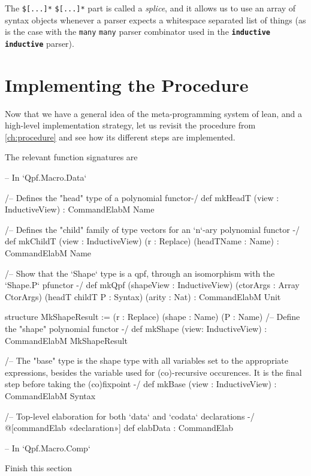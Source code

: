 \documentclass[titlepage]{report}
\newenvironment{todo}{%
\definecolor{shadecolor}{HTML}{F8E0E0}%
\begin{shaded}%
\begin{trivlist}                         
    \item[\hskip \labelsep {\bfseries Todo:}]}{\end{trivlist}\end{shaded}}
\newcommand\lean[1]{%
\ifx\leanmode\undefined%
\def\leanmode{1}%
\texttt{\small #1}%
\undef\leanmode%
\else%
\texttt{#1}%
\fi%
}
\newcommand\keyword[1]{{\color{keywordcolor} \textbf{\lean{#1}}}}
\newcommand\inductive{{\keyword{inductive}}}
\begin{document}
The \lean{\$[...]*} part is called a \emph{splice}, and it allows us to use an array of syntax objects whenever a parser expects a whitespace separated list of things (as is the case with the \lean{many} parser combinator used in the \inductive{} parser).



\section{Implementing the Procedure}
\label{sec:implementing}

Now that we have a general idea of the meta-programming system of lean, and a high-level implementation strategy, let us revisit the procedure from \ref{ch:procedure} and see how its different steps are implemented.

The relevant function signatures are
\begin{leancode}
-- In `Qpf.Macro.Data`

  /-- Defines the "head" type of a polynomial functor-/
  def mkHeadT (view : InductiveView) : CommandElabM Name

  /-- Defines the "child" family of type vectors for an `n`-ary polynomial functor -/
  def mkChildT (view : InductiveView) (r : Replace) (headTName : Name)
               : CommandElabM Name

  /-- Show that the `Shape` type is a qpf, through an isomorphism with the 
      `Shape.P` pfunctor -/
  def mkQpf (shapeView : InductiveView) (ctorArgs : Array CtorArgs) 
            (headT childT P : Syntax) (arity : Nat) 
            : CommandElabM Unit    


  structure MkShapeResult := (r : Replace) (shape : Name) (P : Name)
  /-- Define the "shape" polynomial functor -/
  def mkShape (view: InductiveView) : CommandElabM MkShapeResult


  /-- The "base" type is the shape type with all variables set to the appropriate
      expressions, besides the variable used for (co)-recursive occurences.
      It is the final step before taking the (co)fixpoint -/
  def mkBase (view : InductiveView) : CommandElabM Syntax


  /-- Top-level elaboration for both `data` and `codata` declarations -/
  @[commandElab «declaration»] def elabData : CommandElab

-- In `Qpf.Macro.Comp`
\end{leancode}


\begin{todo}
    Finish this section
\end{todo}
\end{document}
